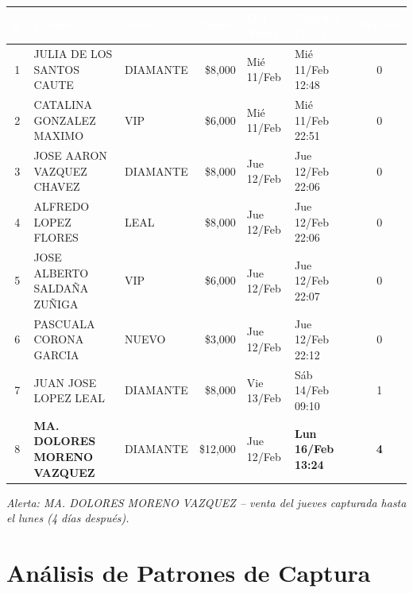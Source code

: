 \documentclass[11pt,a4paper]{article}
\begin{document}
\vspace{0.3cm}
\begin{center}
\renewcommand{\arraystretch}{1.3}
\footnotesize
\begin{tabular}{|c|l|l|r|l|l|c|}
\hline
\rowcolor{headerblue}
\textcolor{white}{\textbf{\#}} &
\textcolor{white}{\textbf{Cliente}} &
\textcolor{white}{\textbf{Nivel}} &
\textcolor{white}{\textbf{Monto}} &
\textcolor{white}{\textbf{D\'ia Venta}} &
\textcolor{white}{\textbf{Captura (MX)}} &
\textcolor{white}{\textbf{Retraso}} \\
\hline
1 & JULIA DE LOS SANTOS CAUTE & DIAMANTE & \$8,000 & Mi\'e 11/Feb & Mi\'e 11/Feb 12:48 & 0 \\
\hline
\rowcolor{lightgray}
2 & CATALINA GONZALEZ MAXIMO & VIP & \$6,000 & Mi\'e 11/Feb & Mi\'e 11/Feb 22:51 & 0 \\
\hline
3 & JOSE AARON VAZQUEZ CHAVEZ & DIAMANTE & \$8,000 & Jue 12/Feb & Jue 12/Feb 22:06 & 0 \\
\hline
\rowcolor{lightgray}
4 & ALFREDO LOPEZ FLORES & LEAL & \$8,000 & Jue 12/Feb & Jue 12/Feb 22:06 & 0 \\
\hline
5 & JOSE ALBERTO SALDA\~NA ZU\~NIGA & VIP & \$6,000 & Jue 12/Feb & Jue 12/Feb 22:07 & 0 \\
\hline
\rowcolor{lightgray}
6 & PASCUALA CORONA GARCIA & NUEVO & \$3,000 & Jue 12/Feb & Jue 12/Feb 22:12 & 0 \\
\hline
7 & JUAN JOSE LOPEZ LEAL & DIAMANTE & \$8,000 & Vie 13/Feb & \textcolor{alertred}{S\'ab 14/Feb 09:10} & \textcolor{alertred}{1} \\
\hline
\rowcolor{lightgray}
8 & \textcolor{alertred}{\textbf{MA. DOLORES MORENO VAZQUEZ}} & DIAMANTE & \$12,000 & Jue 12/Feb & \textcolor{alertred}{\textbf{Lun 16/Feb 13:24}} & \textcolor{alertred}{\textbf{4}} \\
\hline
\end{tabular}
\end{center}

\vspace{0.2cm}
\textit{\textcolor{alertred}{Alerta: MA. DOLORES MORENO VAZQUEZ -- venta del jueves capturada hasta el lunes (4 d\'ias despu\'es).}}

\newpage

\section*{\textcolor{headerblue}{An\'alisis de Patrones de Captura}}
\end{document}
